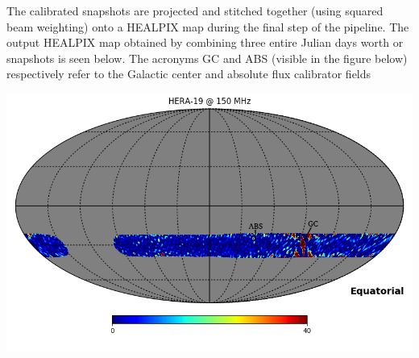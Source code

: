 \documentclass[a0,portrait]{a0poster}
\begin{document}
\begin{multicols}{2}
The calibrated snapshots are projected and stitched together (using squared beam weighting) onto a HEALPIX map during the final step of the pipeline. The output HEALPIX map 
obtained by combining three entire Julian days worth or snapshots is seen below. The acronyms GC and ABS (visible in the figure below) respectively refer 
to the Galactic center and absolute flux calibrator fields

\begin{center}\vspace{1cm}
\includegraphics[width=1\linewidth]{ALL_SKY0.png}
\end{center}\vspace{1cm}








\end{multicols}
\end{document}
